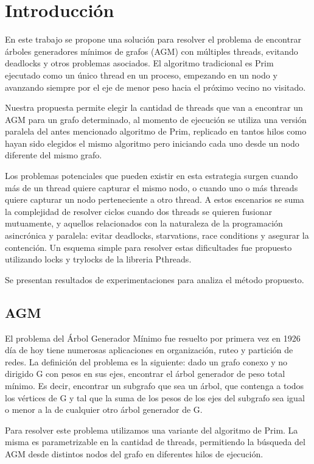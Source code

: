 \section{Introducción}

En este trabajo se propone una solución para resolver el problema de encontrar árboles generadores mínimos de grafos (AGM) con múltiples threads, evitando deadlocks y otros problemas asociados. El algoritmo tradicional es Prim ejecutado como un único thread en un proceso, empezando en un nodo y avanzando siempre por el eje de menor peso hacia el próximo vecino no visitado.

Nuestra propuesta permite elegir la cantidad de threads que van a encontrar un AGM para un grafo determinado, al momento de ejecución se utiliza una versión paralela del antes mencionado algoritmo de Prim, replicado en tantos hilos como hayan sido elegidos el mismo algoritmo pero iniciando cada uno desde un nodo diferente del mismo grafo.

Los problemas potenciales que pueden existir en esta estrategia surgen cuando más de un thread quiere capturar el mismo nodo, o cuando uno o más threads quiere capturar un nodo perteneciente a otro thread. A estos escenarios se suma la complejidad de resolver ciclos cuando dos threads se quieren fusionar mutuamente, y aquellos relacionados con la naturaleza de la programación asincrónica y paralela: evitar deadlocks, starvations, race conditions y asegurar la contención. Un esquema simple para resolver estas dificultades fue propuesto utilizando locks y trylocks de la libreria Pthreads.

Se presentan resultados de experimentaciones para analiza el método propuesto.

\subsection{AGM}

El problema del Árbol Generador Mínimo fue resuelto por primera vez en 1926 día de hoy tiene numerosas aplicaciones en organización, ruteo y partición de redes. La definición del problema es la siguiente: dado un grafo conexo y no dirigido G con pesos en sus ejes, encontrar el árbol generador de peso total mínimo. Es decir, encontrar un subgrafo que sea un árbol, que contenga a todos los vértices de G y tal que la suma de los pesos de los ejes del subgrafo sea igual o menor a la de cualquier otro árbol generador de G.

Para resolver este problema utilizamos una variante del algoritmo de Prim. La misma es parametrizable en la cantidad de threads, permitiendo la búsqueda del AGM desde distintos nodos del grafo en diferentes hilos de ejecución.

